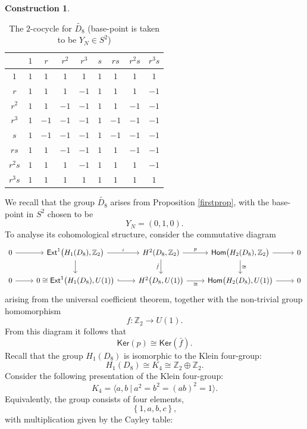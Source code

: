 \documentclass{article}
\theoremstyle{plain}
\theoremstyle{definition}
\newtheorem{const}[thm]{Construction}
\begin{document}
\begin{const}
\begin{table}[H]
\begin{tabular}{ c | c | c | c | c | c | c | c | c }
& $1$ & $r$ & $r^2$ & $r^3$ & $s$ & $rs$ & $r^2s$ & $r^3s$ \\
\hline
$1$ & $1$ & $1$ & $1$ & $1$ & $1$ & $1$ & $1$ & $1$ \\
\hline
$r$ & $1$ & $1$ & $1$ & $-1$ & $1$ & $1$ & $1$ & $-1$ \\
\hline
$r^2$ & $1$ & $1$ & $-1$ & $-1$ & $1$ & $1$ & $-1$ & $-1$ \\
\hline
$r^3$ & $1$ & $-1$ & $-1$ & $-1$ & $1$ & $-1$ & $-1$ & $-1$ \\
\hline
$s$ & $1$ & $-1$ & $-1$ & $-1$ & $1$ & $-1$ & $-1$ & $-1$ \\
\hline
$rs$ & $1$ & $1$ & $-1$ & $-1$ & $1$ & $1$ & $-1$ & $-1$ \\
\hline
$r^2s$ & $1$ & $1$ & $1$ & $-1$ & $1$ & $1$ & $1$ & $-1$ \\
\hline
$r^3s$ & $1$ & $1$ & $1$ & $1$ & $1$ & $1$ & $1$ & $1$
\end{tabular}
\caption{The $2$-cocycle for $\widetilde{D_8}$ (base-point is taken to be $Y_N \in S^2$)}
\label{tildedihco}
\end{table}
We recall that the group $\widetilde{D_8}$ arises from Proposition \ref{firstprop}, with the base-point in $S^2$ chosen to be
\[
Y_N = (0,1,0).
\]
To analyse its cohomological structure, consider the commutative diagram
\[
\begin{tikzcd}[scale=0.95,transform shape]
0 \arrow [r] & \mathsf{Ext}^1\bigl(H_1(D_8),\mathbb{Z}_2\bigr) \arrow[r,"i"] \arrow[d] & H^2(D_8,\mathbb{Z}_2) \arrow[r,"p"] \arrow[d,"\bar{f}"'] & \mathsf{Hom}\bigl(H_2(D_8),\mathbb{Z}_2\bigr) \arrow[r] \arrow[d,"\cong"] & 0 \\
0 \arrow[r] & 0 \cong \mathsf{Ext}^1\bigl(H_1(D_8),U(1)\bigr) \arrow[r,hook] & H^2\bigl(D_8,U(1)\bigr) \arrow[r,"\cong"'] & \mathsf{Hom}\bigl(H_2(D_8),U(1)\bigr) \arrow[r] & 0
\end{tikzcd}
\]
arising from the universal coefficient theorem, together with the non-trivial group homomorphism 
$$f:\mathbb{Z}_2 \longrightarrow U(1).$$
From this diagram it follows that 
$$\mathsf{Ker}(p) \cong \mathsf{Ker}(\bar{f}).$$
Recall that the group $H_1(D_8)$ is isomorphic to the Klein four-group:
\[
H_1(D_8) \cong K_4 \cong \mathbb{Z}_2 \oplus \mathbb{Z}_2.
\]
Consider the following presentation of the Klein four-group:
$$K_4 = \langle a, b ~ \big\vert ~ a^2 = b^2 = (ab)^2 = 1\rangle.$$
Equivalently, the group consists of four elements,
$$\left\{1,a,b,c\right\},$$
with multiplication given by the Cayley table:
\begin{table}[H]

\end{table}
\end{const}
\end{document}
